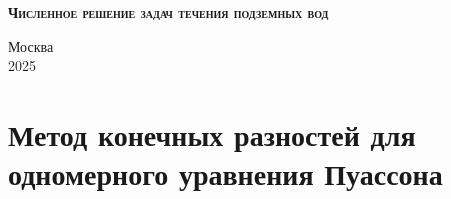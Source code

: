 \documentclass[a4paper, 11pt]{article}
\begin{document}
\begin{titlepage}
	\newpage
	
	\begin{center}
	\end{center}
	
	\vspace{8em}
	
	\begin{center}
	\end{center}
	
	\vspace{2em}
	
	\begin{center}
		\textsc{\textbf{Численное решение задач течения подземных вод}}
	\end{center}
	
	\vspace{6em}
	
	
	
	\newbox{\lbox}
	\savebox{\lbox}{\hbox{}}
	\newlength{\maxl}
	\setlength{\maxl}{\wd\lbox}
	\hfill\parbox{11cm}{
	}
	
	
	\vspace{\fill}
	
	\begin{center}
		Москва \\ 2025
	\end{center}
	
\end{titlepage}

\setcounter{MaxMatrixCols}{20}

\section{Метод конечных разностей для одномерного уравнения Пуассона}
\end{document}
